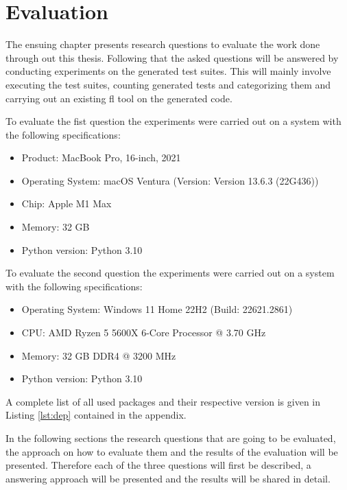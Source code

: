 \documentclass[
fancyheadings, %
%
%
]{stsreprt}
\begin{document}
\chapter{Evaluation}\label{ch:eval}
The ensuing chapter presents research questions to evaluate the work done through out this thesis. Following that the asked questions will be answered by conducting experiments on the generated test suites. This will mainly involve executing the test suites, counting generated tests and categorizing them and carrying out an existing \acrshort{fl} tool on the generated code. \par
To evaluate the fist question the experiments were carried out on a system with the following specifications: 
\begin{itemize}
    \item Product: MacBook Pro, 16-inch, 2021
    \item Operating System: macOS Ventura (Version: Version 13.6.3 (22G436))
    \item Chip: Apple M1 Max
    \item Memory: 32 GB
    \item Python version: Python 3.10
\end{itemize}

To evaluate the second question the experiments were carried out on a system with the following specifications: 
\begin{itemize}
    \item Operating System: Windows 11 Home 22H2 (Build: 22621.2861)
    \item CPU: AMD Ryzen 5 5600X 6-Core Processor @ 3.70 GHz
    \item Memory: 32 GB DDR4 @ 3200 MHz
    \item Python version: Python 3.10
\end{itemize}

A complete list of all used packages and their respective version is given in Listing \ref{lst:dep} contained in the appendix. \par 

In the following sections the research questions that are going to be evaluated, the approach on how to evaluate them and the results of the evaluation will be presented. 
Therefore each of the three questions will first be described, a answering approach will be presented and the results will be shared in detail.
\end{document}
